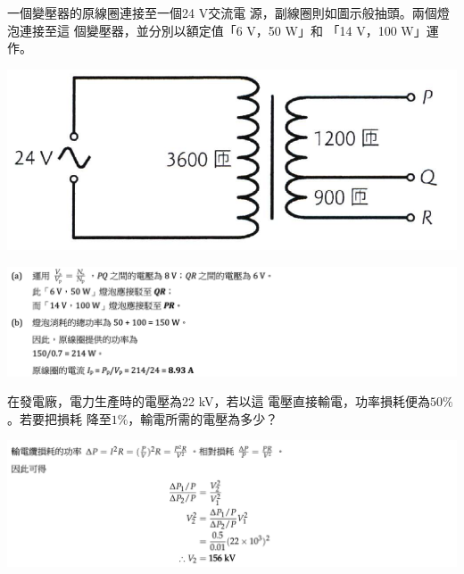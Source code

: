 {
    一個變壓器的原線圈連接至一個24 V交流電 源，副線圈則如圖示般抽頭。兩個燈泡連接至這 個變壓器，並分別以額定值「6 V，50 W」和 「14 V，100 W」運作。
    \par{\par\centering\includegraphics[width=.45\textwidth]{./img/ch_ACtransformer_lq_2024-06-17-20-05-52.png}\par}
}{
    \par{\par\centering\includegraphics[width=\textwidth]{./img/ch_ACtransformer_lq_2024-06-17-20-38-35.png}\par}
}

{
    在發電廠，電力生產時的電壓為22 kV，若以這 電壓直接輸電，功率損耗便為$50\%$。若要把損耗 降至$1\%$，輸電所需的電壓為多少？
}{
    \par{\par\centering\includegraphics[width=\textwidth]{./img/ch_ACtransformer_lq_2024-06-17-20-39-28.png}\par}
}

